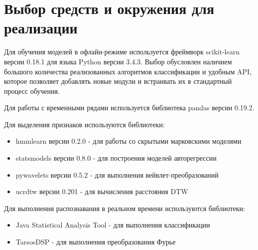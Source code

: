 
\section{Выбор средств и окружения для реализации}

Для обучения моделей в офлайн-режиме используется фреймворк scikit-learn версии 0.18.1 для языка Python версии 3.4.3. Выбор обусловлен наличием большого количества реализованных алгоритмов классификации и удобным API, которое позволяет добавлять новые модули и встраивать их в стандартный процесс обучения. 

Для работы с временными рядами используется библиотека pandas версии 0.19.2.

Для выделения признаков используются библиотеки:

\begin{itemize}
\item hmmlearn версии 0.2.0 - для работы со скрытыми марковскими моделями
\item statsmodels версии 0.8.0 - для построения моделей авторегрессии
\item pywavelets версии 0.5.2 - для выполнения вейвлет-преобразований
\item ucrdtw версии 0.201 - для вычисления расстояния DTW
\end{itemize}

Для выполнения распознавания в реальном времени используются библиотеки:

\begin{itemize}
\item Java Statistical Analysis Tool - для выполнения классификации
\item TarsosDSP - для выполнения преобразования Фурье
\end{itemize}


